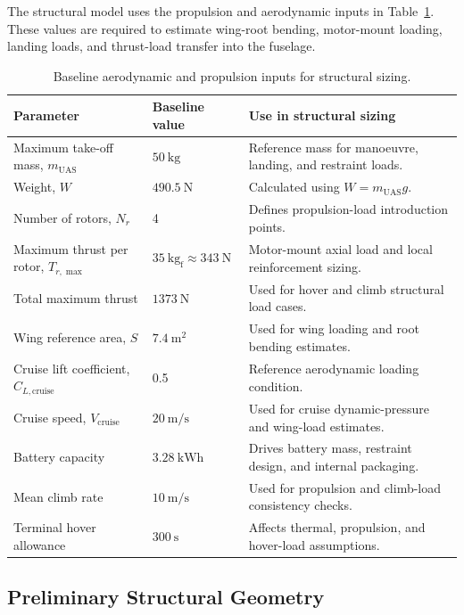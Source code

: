 The structural model uses the propulsion and aerodynamic inputs in Table~\ref{tab:aero_prop_inputs_structures}. These values are required to estimate wing-root bending, motor-mount loading, landing loads, and thrust-load transfer into the fuselage.

\begin{table}[H]
\centering
\small
\caption{Baseline aerodynamic and propulsion inputs for structural sizing.}
\label{tab:aero_prop_inputs_structures}
\begin{tabularx}{\textwidth}{@{}p{}p{}X@{}}
\toprule
\textbf{Parameter} & \textbf{Baseline value} & \textbf{Use in structural sizing} \\
\midrule
Maximum take-off mass, \(m_{\mathrm{UAS}}\) & \(50~\mathrm{kg}\) & Reference mass for manoeuvre, landing, and restraint loads. \\
Weight, \(W\) & \(490.5~\mathrm{N}\) & Calculated using \(W=m_{\mathrm{UAS}}g\). \\
Number of rotors, \(N_r\) & 4 & Defines propulsion-load introduction points. \\
Maximum thrust per rotor, \(T_{r,\max}\) & \(35~\mathrm{kg_f}\approx343~\mathrm{N}\) & Motor-mount axial load and local reinforcement sizing. \\
Total maximum thrust & \(1373~\mathrm{N}\) & Used for hover and climb structural load cases. \\
Wing reference area, \(S\) & \(7.4~\mathrm{m^2}\) & Used for wing loading and root bending estimates. \\
Cruise lift coefficient, \(C_{L,\mathrm{cruise}}\) & 0.5 & Reference aerodynamic loading condition. \\
Cruise speed, \(V_{\mathrm{cruise}}\) & \(20~\mathrm{m/s}\) & Used for cruise dynamic-pressure and wing-load estimates. \\
Battery capacity & \(3.28~\mathrm{kWh}\) & Drives battery mass, restraint design, and internal packaging. \\
Mean climb rate & \(10~\mathrm{m/s}\) & Used for propulsion and climb-load consistency checks. \\
Terminal hover allowance & \(300~\mathrm{s}\) & Affects thermal, propulsion, and hover-load assumptions. \\
\bottomrule
\end{tabularx}
\end{table}

\subsection{Preliminary Structural Geometry}

